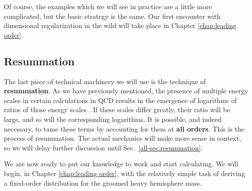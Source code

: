 \documentclass[../thesis.tex]{subfiles}
\begin{document}
	Of course, the examples which we will see in practice are a little more complicated, but the basic strategy is the same. Our first encounter with dimensional regularization in the wild will take place in Chapter \ref{chap:leading order}.

\subsection{Resummation}
	The last piece of technical machinery we will use is the technique of \textbf{resummation}. As we have previously mentioned, the presence of multiple energy scales in certain calculations in QCD results in the emergence of logarithms of ratios of those energy scales \cite{larkoski_elementary_2019-1,becher_introduction_2015-1}. If these scales differ greatly, their ratio will be large, and so will the corresponding logarithms. It is possible, and indeed necessary, to tame these terms by accounting for them at \textbf{all orders}. This is the process of resummation. The actual mechanics will make more sense in context, so we will delay further discussion until Sec.~\ref{all-sec:resummation}.

	We are now ready to put our knowledge to work and start calculating. We will begin, in Chapter \ref{chap:leading order}, with the relatively simple task of deriving a fixed-order distribution for the groomed heavy hemisphere mass.
\end{document}
